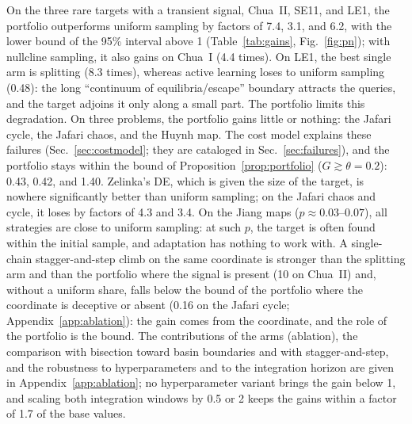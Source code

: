 On the three rare targets with a transient signal, Chua~II, SE11, and LE1, the portfolio outperforms uniform sampling by factors of 7.4, 3.1, and 6.2, with the lower bound of the 95\% interval above 1 (Table~\ref{tab:gains}, Fig.~\ref{fig:pn}); with nullcline sampling, it also gains on Chua~I (4.4 times). On LE1, the best single arm is splitting (8.3 times), whereas active learning loses to uniform sampling (0.48): the long ``continuum of equilibria/escape'' boundary attracts the queries, and the target adjoins it only along a small part. The portfolio limits this degradation. On three problems, the portfolio gains little or nothing: the Jafari cycle, the Jafari chaos, and the Huynh map. The cost model explains these failures (Sec.~\ref{sec:costmodel}; they are cataloged in Sec.~\ref{sec:failures}), and the portfolio stays within the bound of Proposition~\ref{prop:portfolio} ($G\gtrsim\theta=0.2$): 0.43, 0.42, and 1.40. Zelinka's DE, which is given the size of the target, is nowhere significantly better than uniform sampling; on the Jafari chaos and cycle, it loses by factors of 4.3 and 3.4. On the Jiang maps ($p\approx0.03$--$0.07$), all strategies are close to uniform sampling: at such $p$, the target is often found within the initial sample, and adaptation has nothing to work with. A single-chain stagger-and-step climb on the same coordinate\cite{SweetNusseYorke2001} is stronger than the splitting arm and than the portfolio where the signal is present (10 on Chua~II) and, without a uniform share, falls below the bound of the portfolio where the coordinate is deceptive or absent (0.16 on the Jafari cycle; Appendix~\ref{app:ablation}): the gain comes from the coordinate, and the role of the portfolio is the bound. The contributions of the arms (ablation), the comparison with bisection toward basin boundaries and with stagger-and-step, and the robustness to hyperparameters and to the integration horizon are given in Appendix~\ref{app:ablation}; no hyperparameter variant brings the gain below 1, and scaling both integration windows by 0.5 or 2 keeps the gains within a factor of 1.7 of the base values.

